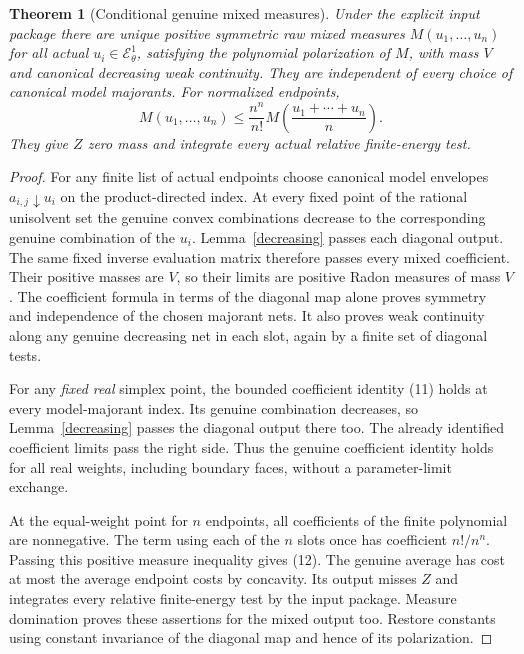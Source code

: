 \documentclass[11pt]{article}
\newtheorem{theorem}{Theorem}
\newcommand{\EE}{\mathcal E^1_\theta}
\begin{document}
\begin{theorem}[Conditional genuine mixed measures]\label{mixed}
Under the explicit input package there are unique positive symmetric
raw mixed measures $M(u_1,\ldots,u_n)$ for all actual
$u_i\in\EE$, satisfying the polynomial polarization of $M$,
with mass $V$ and canonical decreasing weak continuity.
They are independent of every choice of canonical model majorants.
For normalized endpoints,
\[
 M(u_1,\ldots,u_n)
 \leq\frac{n^n}{n!}M\!\left(\frac{u_1+\cdots+u_n}{n}\right).
                                                               \tag{12}
\]
They give $Z$ zero mass and integrate every actual relative
finite-energy test.
\end{theorem}
\begin{proof}
For any finite list of actual endpoints choose canonical model
envelopes $a_{i,j}\downarrow u_i$ on the product-directed index.
At every fixed point of the rational unisolvent set the genuine
convex combinations decrease to the corresponding genuine
combination of the $u_i$. Lemma~\ref{decreasing} passes each
diagonal output. The same fixed inverse evaluation matrix
therefore passes every mixed coefficient.
Their positive masses are $V$, so their limits are positive Radon
measures of mass $V$.
The coefficient formula in terms of the diagonal map alone
proves symmetry and independence of the chosen majorant nets.
It also proves weak continuity along any genuine decreasing
net in each slot, again by a finite set of diagonal tests.

For any \emph{fixed real} simplex point, the bounded coefficient
identity (11) holds at every model-majorant index.
Its genuine combination decreases, so Lemma~\ref{decreasing}
passes the diagonal output there too.
The already identified coefficient limits pass the right side.
Thus the genuine coefficient identity holds for all real weights,
including boundary faces, without a parameter-limit exchange.

At the equal-weight point for $n$ endpoints, all coefficients of
the finite polynomial are nonnegative.
The term using each of the $n$ slots once has coefficient
$n!/n^n$. Passing this positive measure inequality gives (12).
The genuine average has cost at most the average endpoint costs
by concavity. Its output misses $Z$ and integrates every relative
finite-energy test by the input package. Measure domination
proves these assertions for the mixed output too.
Restore constants using constant invariance of the diagonal
map and hence of its polarization.
\end{proof}
\end{document}
